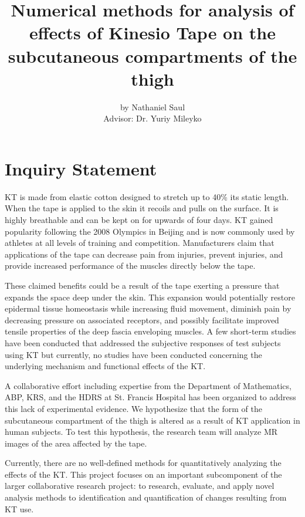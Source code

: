 \documentclass[ letterpaper, 12 pt, conference]{ieeeconf}  %
\title{\LARGE  Numerical methods for analysis of effects of Kinesio Tape on the subcutaneous compartments of the thigh}%
\author{by Nathaniel Saul \\ Advisor: Dr. Yuriy Mileyko}
\begin{document}
\maketitle
\thispagestyle{empty}
\pagestyle{empty}

\section{Inquiry Statement}  

 \ac{KT} is made from elastic cotton designed to stretch up to 40\% its static length. When the tape is applied to the skin it recoils and pulls on the surface. It is highly breathable and can be kept on for upwards of four days. \ac{KT} gained popularity following the 2008 Olympics in Beijing and is now commonly used by athletes at all levels of training and competition.   Manufacturers claim that applications of the tape can decrease pain from injuries, prevent injuries, and provide increased performance of the muscles directly below the tape.     

These claimed benefits could be a result of the tape exerting a pressure that expands the space deep under the skin.  This expansion would potentially restore epidermal tissue homeostasis while increasing fluid movement, diminish pain by decreasing pressure on associated receptors, and possibly facilitate improved tensile properties of the deep fascia enveloping muscles. A few short-term studies have been conducted that addressed the subjective responses of test subjects using \ac{KT} \cite{Konishi2013}\cite{Osorio2013} \cite{OSullivan2011} but currently, no studies have been conducted concerning the underlying mechanism and functional effects of the \ac{KT}.

A collaborative effort including expertise from the Department of Mathematics, \ac{ABP}, \ac{KRS}, and the \ac{HDRS} at St. Francis Hospital has been organized to address this lack of experimental evidence. We hypothesize that the form of the subcutaneous compartment of the thigh is altered as a result of KT application in human subjects. To test this hypothesis, the research team will analyze MR images of the area affected by the tape. 

Currently, there are no well-defined methods for quantitatively analyzing the effects of the \ac{KT}.  This project focuses on an important subcomponent of the larger collaborative research project: to research, evaluate, and apply novel analysis methods to identification and quantification of changes resulting from \ac{KT} use.  
\end{document}

